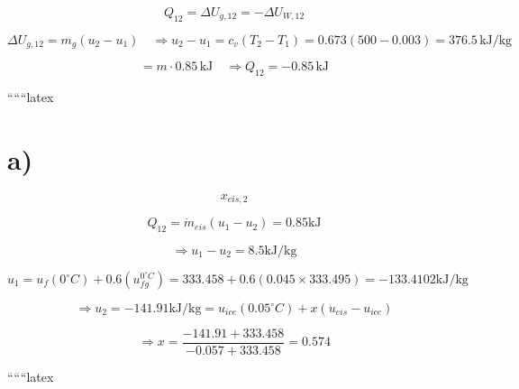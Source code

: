 \[
Q_{12} = \Delta U_{g,12} = -\Delta U_{W,12}
\]

\[
\Delta U_{g,12} = m_g (u_2 - u_1) \quad \Rightarrow u_2 - u_1 = c_v (T_2 - T_1) = 0.673 (500 - 0.003) = 376.5 \, \text{kJ/kg}
\]

\[
= m \cdot 0.85 \, \text{kJ} \quad \Rightarrow Q_{12} = -0.85 \, \text{kJ}
\]

``````latex

\section*{a)}

\[
x_{eis,2}
\]

\[
Q_{12} = \dot{m}_{eis} (u_1 - u_2) = 0.85 \text{kJ}
\]

\[
\Rightarrow u_1 - u_2 = 8.5 \text{kJ/kg}
\]

\[
u_1 = u_f(0^\circ C) + 0.6 \left( u_{fg}^{0^\circ C} \right) = 333.458 + 0.6 \left( 0.045 \times 333.495 \right) = -133.4102 \text{kJ/kg}
\]

\[
\Rightarrow u_2 = -141.91 \text{kJ/kg} = u_{ice}(0.05^\circ C) + x \left( u_{eis} - u_{ice} \right)
\]

\[
\Rightarrow x = \frac{-141.91 + 333.458}{-0.057 + 333.458} = \boxed{0.574}
\]

``````latex


